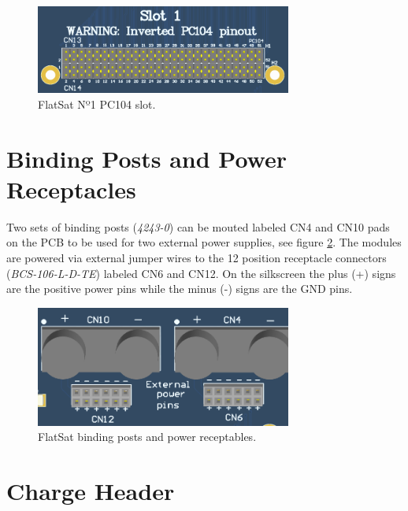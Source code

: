 \begin{figure}[!ht]
    \begin{center}
        \includegraphics[width=0.75\textwidth]{figures/pc104_slot_n1.png}
        \caption{FlatSat Nº1 PC104 slot.}
        \label{fig:n1-slot}
    \end{center}
\end{figure}

\section{Binding Posts and Power Receptacles}

Two sets of binding posts (\textit{4243-0}) can be mouted labeled CN4 and CN10 pads on the PCB to be used for two external power supplies, see figure \ref{fig:binding-posts}. The modules are powered via external jumper wires to the 12 position receptacle connectors (\textit{BCS-106-L-D-TE}) labeled CN6 and CN12. On the silkscreen the plus (+) signs are the positive power pins while the minus (-) signs are the GND pins.

\begin{figure}[!ht]
    \begin{center}
        \includegraphics[width=0.75\textwidth]{figures/binding_posts.png}
        \caption{FlatSat binding posts and power receptables.}
        \label{fig:binding-posts}
    \end{center}
\end{figure}

\section{Charge Header}

